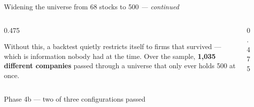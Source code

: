 \documentclass[aspectratio=169,10pt]{beamer}
\makeatletter
\newcommand{\eyebrow}[1]{\def\@eyebrow{#1}}
\newcommand{\bodytext}[1]{{\sffamily\fontsize{7.4}{9.7}\selectfont\color{ink2}#1\par}}
\newcommand{\str}[1]{{\color{ink}\bfseries #1}}
\makeatother
\begin{document}
\eyebrow{Phase 4b}
\begin{frame}[t]{Widening the universe from 68 stocks to 500 \textnormal{\itshape --- continued}}
\begin{columns}[T]\begin{column}{0.475\textwidth}\bodytext{Without this, a backtest quietly restricts itself to firms that survived — which is information nobody had at the time. Over the sample, \str{1,035 different companies} passed through a universe that only ever holds 500 at once.}\end{column}\begin{column}{0.475\textwidth}\end{column}\end{columns}
\end{frame}
\eyebrow{Phase 4b}
\begin{frame}[t]{Phase 4b — two of three configurations passed}

\end{frame}
\end{document}
